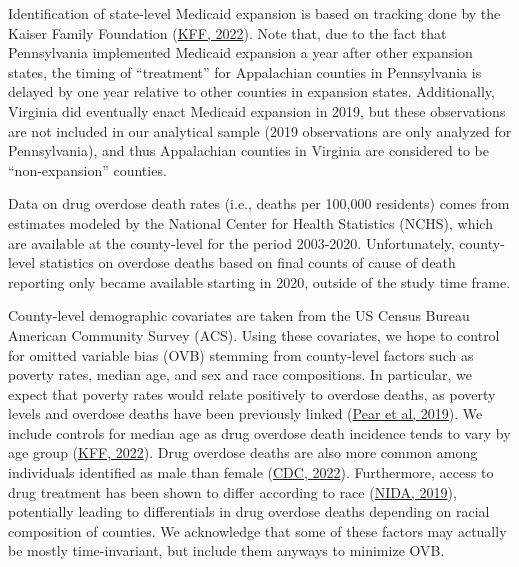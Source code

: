 \documentclass[
  11pt,
]{article}
\begin{document}
Identification of state-level Medicaid expansion is based on tracking
done by the Kaiser Family Foundation
(\href{https://www.kff.org/medicaid/issue-brief/status-of-state-medicaid-expansion-decisions-interactive-map/}{KFF,
2022}). Note that, due to the fact that Pennsylvania implemented
Medicaid expansion a year after other expansion states, the timing of
``treatment'' for Appalachian counties in Pennsylvania is delayed by one
year relative to other counties in expansion states. Additionally,
Virginia did eventually enact Medicaid expansion in 2019, but these
observations are not included in our analytical sample (2019
observations are only analyzed for Pennsylvania), and thus Appalachian
counties in Virginia are considered to be ``non-expansion'' counties.

Data on drug overdose death rates (i.e., deaths per 100,000 residents)
comes from estimates modeled by the National Center for Health
Statistics (NCHS), which are available at the county-level for the
period 2003-2020. Unfortunately, county-level statistics on overdose
deaths based on final counts of cause of death reporting only became
available starting in 2020, outside of the study time frame.

County-level demographic covariates are taken from the US Census Bureau
American Community Survey (ACS). Using these covariates, we hope to
control for omitted variable bias (OVB) stemming from county-level
factors such as poverty rates, median age, and sex and race
compositions. In particular, we expect that poverty rates would relate
positively to overdose deaths, as poverty levels and overdose deaths
have been previously linked
(\href{https://pubmed.ncbi.nlm.nih.gov/30592998/}{Pear et al, 2019}). We
include controls for median age as drug overdose death incidence tends
to vary by age group
(\href{https://www.kff.org/other/state-indicator/opioid-overdose-deaths-by-age-group/?dataView=1\&currentTimeframe=6\&selectedDistributions=0-24--25-34--35-44--45-54\&sortModel=\%7B\%22colId\%22:\%22Location\%22,\%22sort\%22:\%22asc\%22\%7D}{KFF,
2022}). Drug overdose deaths are also more common among individuals
identified as male than female
(\href{https://www.cdc.gov/nchs/hus/topics/drug-overdose-deaths.htm}{CDC,
2022}). Furthermore, access to drug treatment has been shown to differ
according to race
(\href{https://nida.nih.gov/about-nida/noras-blog/2019/07/access-to-addiction-services-differs-by-race-gender}{NIDA,
2019}), potentially leading to differentials in drug overdose deaths
depending on racial composition of counties. We acknowledge that some of
these factors may actually be mostly time-invariant, but include them
anyways to minimize OVB.
\end{document}
